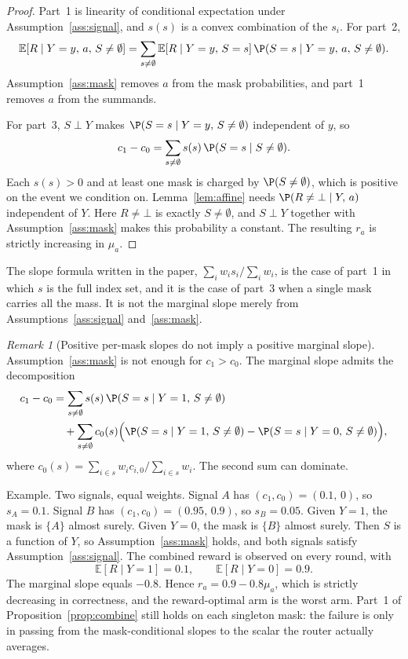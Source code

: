 \documentclass{article}
\theoremstyle{definition}
\theoremstyle{remark}
\newtheorem{remark}[theorem]{Remark}
\newcommand{\E}{\mathbb{E}}
\begin{document}
\begin{proof}
Part~1 is linearity of conditional expectation under Assumption~\ref{ass:signal}, and $s(s)$ is a convex combination of the $s_i$. For part~2,
\[
\E[R\mid Y=y,\,a,\,S\neq\emptyset]
=\sum_{s\neq\emptyset}\E[R\mid Y=y,\,S=s]\,\P(S=s\mid Y=y,\,a,\,S\neq\emptyset).
\]
Assumption~\ref{ass:mask} removes $a$ from the mask probabilities, and part~1 removes $a$ from the summands.

For part~3, $S\perp Y$ makes $\P(S=s\mid Y=y,\,S\neq\emptyset)$ independent of $y$, so
\[
c_1-c_0=\sum_{s\neq\emptyset}s(s)\,\P(S=s\mid S\neq\emptyset).
\]
Each $s(s)>0$ and at least one mask is charged by $\P(S\neq\emptyset)$, which is positive on the event we condition on. Lemma~\ref{lem:affine} needs $\P(R\neq\bot\mid Y,\,a)$ independent of $Y$. Here $R\neq\bot$ is exactly $S\neq\emptyset$, and $S\perp Y$ together with Assumption~\ref{ass:mask} makes this probability a constant. The resulting $r_a$ is strictly increasing in $\mu_a$.
\end{proof}

The slope formula written in the paper, $\sum_i w_i s_i/\sum_i w_i$, is the case of part~1 in which $s$ is the full index set, and it is the case of part~3 when a single mask carries all the mass. It is not the marginal slope merely from Assumptions~\ref{ass:signal} and~\ref{ass:mask}.

\begin{remark}[Positive per-mask slopes do not imply a positive marginal slope]\label{rem:sign}
Assumption~\ref{ass:mask} is not enough for $c_1>c_0$. The marginal slope admits the decomposition
\begin{align*}
c_1-c_0
&=\sum_{s\neq\emptyset}s(s)\,\P(S=s\mid Y=1,\,S\neq\emptyset)\\
&\quad+\sum_{s\neq\emptyset}c_0(s)\Big(\P(S=s\mid Y=1,\,S\neq\emptyset)-\P(S=s\mid Y=0,\,S\neq\emptyset)\Big),
\end{align*}
where $c_0(s)=\sum_{i\in s}w_i c_{i,0}/\sum_{i\in s}w_i$. The second sum can dominate.

Example. Two signals, equal weights. Signal $A$ has $(c_1,c_0)=(0.1,\,0)$, so $s_A=0.1$. Signal $B$ has $(c_1,c_0)=(0.95,\,0.9)$, so $s_B=0.05$. Given $Y=1$, the mask is $\{A\}$ almost surely. Given $Y=0$, the mask is $\{B\}$ almost surely. Then $S$ is a function of $Y$, so Assumption~\ref{ass:mask} holds, and both signals satisfy Assumption~\ref{ass:signal}. The combined reward is observed on every round, with
\[
\E[R\mid Y=1]=0.1,\qquad\E[R\mid Y=0]=0.9.
\]
The marginal slope equals $-0.8$. Hence $r_a=0.9-0.8\mu_a$, which is strictly decreasing in correctness, and the reward-optimal arm is the worst arm. Part~1 of Proposition~\ref{prop:combine} still holds on each singleton mask: the failure is only in passing from the mask-conditional slopes to the scalar the router actually averages.
\end{remark}
\end{document}
